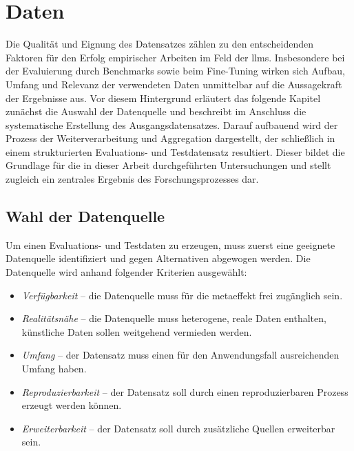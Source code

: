 \chapter{Daten}\label{ch:daten}

Die Qualität und Eignung des Datensatzes zählen zu den entscheidenden Faktoren für den Erfolg empirischer Arbeiten im Feld der \glspl{llm}.
Insbesondere bei der Evaluierung durch Benchmarks sowie beim Fine-Tuning wirken sich Aufbau, Umfang und Relevanz der verwendeten Daten unmittelbar auf die Aussagekraft der Ergebnisse aus.
Vor diesem Hintergrund erläutert das folgende Kapitel zunächst die Auswahl der Datenquelle und beschreibt im Anschluss die systematische Erstellung des Ausgangsdatensatzes.
Darauf aufbauend wird der Prozess der Weiterverarbeitung und Aggregation dargestellt, der schließlich in einem strukturierten Evaluations- und Testdatensatz resultiert.
Dieser bildet die Grundlage für die in dieser Arbeit durchgeführten Untersuchungen und stellt zugleich ein zentrales Ergebnis des Forschungsprozesses dar.


\section{Wahl der Datenquelle}\label{sec:wahl-der-datenquelle}

Um einen Evaluations- und Testdaten zu erzeugen, muss zuerst eine geeignete Datenquelle identifiziert und gegen Alternativen abgewogen werden.
Die Datenquelle wird anhand folgender Kriterien ausgewählt:

\begin{itemize}
    \item \textit{Verfügbarkeit} -- die Datenquelle muss für die metaeffekt frei zugänglich sein.
    \item \textit{Realitätsnähe} -- die Datenquelle muss heterogene, reale Daten enthalten, künstliche Daten sollen weitgehend vermieden werden.
    \item \textit{Umfang} -- der Datensatz muss einen für den Anwendungsfall ausreichenden Umfang haben.
    \item \textit{Reproduzierbarkeit} -- der Datensatz soll durch einen reproduzierbaren Prozess erzeugt werden können.
    \item \textit{Erweiterbarkeit} -- der Datensatz soll durch zusätzliche Quellen erweiterbar sein.
\end{itemize}

